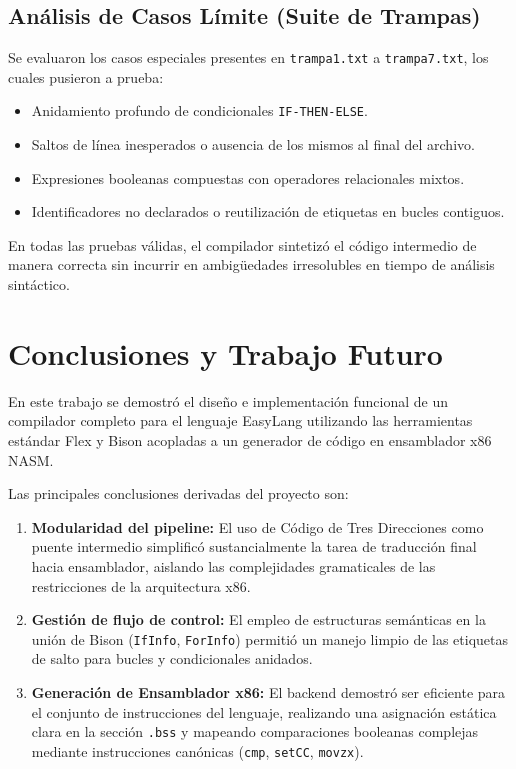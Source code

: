 \documentclass[conference]{IEEEtran}
\begin{document}
\subsection{Análisis de Casos Límite (Suite de Trampas)}
Se evaluaron los casos especiales presentes en \texttt{trampa1.txt} a \texttt{trampa7.txt}, los cuales pusieron a prueba:
\begin{itemize}
    \item Anidamiento profundo de condicionales \texttt{IF-THEN-ELSE}.
    \item Saltos de línea inesperados o ausencia de los mismos al final del archivo.
    \item Expresiones booleanas compuestas con operadores relacionales mixtos.
    \item Identificadores no declarados o reutilización de etiquetas en bucles contiguos.
\end{itemize}
En todas las pruebas válidas, el compilador sintetizó el código intermedio de manera correcta sin incurrir en ambigüedades irresolubles en tiempo de análisis sintáctico.

\section{Conclusiones y Trabajo Futuro}
En este trabajo se demostró el diseño e implementación funcional de un compilador completo para el lenguaje EasyLang utilizando las herramientas estándar Flex y Bison acopladas a un generador de código en ensamblador x86 NASM.

Las principales conclusiones derivadas del proyecto son:
\begin{enumerate}
    \item \textbf{Modularidad del pipeline:} El uso de Código de Tres Direcciones como puente intermedio simplificó sustancialmente la tarea de traducción final hacia ensamblador, aislando las complejidades gramaticales de las restricciones de la arquitectura x86.
    \item \textbf{Gestión de flujo de control:} El empleo de estructuras semánticas en la unión de Bison (\texttt{IfInfo}, \texttt{ForInfo}) permitió un manejo limpio de las etiquetas de salto para bucles y condicionales anidados.
    \item \textbf{Generación de Ensamblador x86:} El backend demostró ser eficiente para el conjunto de instrucciones del lenguaje, realizando una asignación estática clara en la sección \texttt{.bss} y mapeando comparaciones booleanas complejas mediante instrucciones canónicas (\texttt{cmp}, \texttt{setCC}, \texttt{movzx}).
\end{enumerate}
\end{document}
